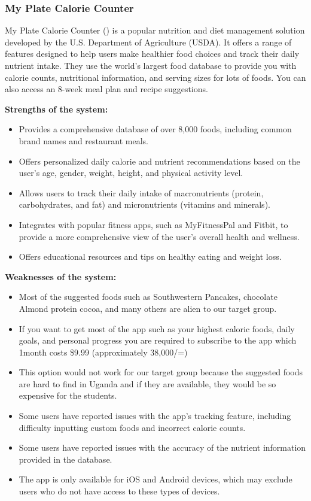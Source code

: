 \documentclass{article}
\begin{document}
\subsubsection{My Plate Calorie Counter}

My Plate Calorie Counter (\cite{myplate}) is a popular nutrition and diet management solution developed by the U.S. Department of Agriculture (USDA). It offers a range of features designed to help users make healthier food choices and track their daily nutrient intake. They use the world’s largest food database to provide you with calorie counts, nutritional information, and serving sizes for lots of foods. You can also access an 8-week meal plan and recipe suggestions.

\textbf{Strengths of the system:}
\begin{itemize}

\item Provides a comprehensive database of over 8,000 foods, including common brand names and restaurant meals.
\item Offers personalized daily calorie and nutrient recommendations based on the user's age, gender, weight, height, and physical activity level.
\item Allows users to track their daily intake of macronutrients (protein, carbohydrates, and fat) and micronutrients (vitamins and minerals).
\item Integrates with popular fitness apps, such as MyFitnessPal and Fitbit, to provide a more comprehensive view of the user's overall health and wellness.
\item Offers educational resources and tips on healthy eating and weight loss.

\end{itemize}

\textbf{Weaknesses of the system:}
\begin{itemize}
\item Most of the suggested foods such as Southwestern Pancakes, chocolate Almond protein cocoa, and many others are alien to our target group.
\item If you want to get most of the app such as your highest caloric foods, daily goals, and personal progress you are required to subscribe to the app which 1month costs \$9.99 (approximately 38,000/=)
\item This option would not work for our target group because the suggested foods are hard to find in Uganda and if they are available, they would be so expensive for the students.

\item Some users have reported issues with the app's tracking feature, including difficulty inputting custom foods and incorrect calorie counts.
\item Some users have reported issues with the accuracy of the nutrient information provided in the database.
\item The app is only available for iOS and Android devices, which may exclude users who do not have access to these types of devices.

\end{itemize}
\end{document}
